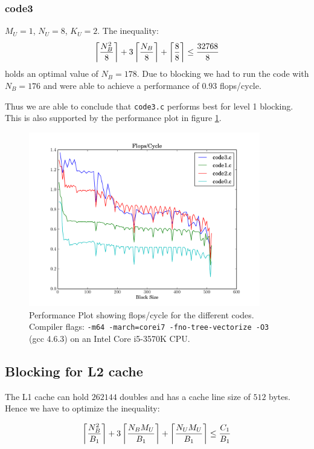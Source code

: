 \documentclass[portrait,a4paper]{article}
\begin{document}
\subsubsection{code3}
$M_U=1$, $N_U=8$, $K_U=2$. The inequality:
\begin{align*}
    \left\lceil {N_B^2 \over 8} \right\rceil + 3\left\lceil {N_B \over 8} \right\rceil
    + \left\lceil {8 \over 8} \right\rceil \leq {32768 \over 8}
\end{align*}
holds an optimal value of $N_B=178$. Due to blocking we had to run the code with $N_B=176$ and were able to achieve a performance of $0.93$ flops/cycle.

Thus we are able to conclude that \lstinline{code3.c} performs best for level 1 blocking. This is also supported by the performance plot in figure \ref{fig:flops_cycle}.

\begin{figure}[H]
    \centering
    \includegraphics[width=0.9\textwidth]{code/flops_cycle}
    \caption{Performance Plot showing flops/cycle for the different codes. Compiler flags: \texttt{-m64 -march=corei7 -fno-tree-vectorize -O3} (gcc 4.6.3) on an Intel Core i5-3570K CPU.}
    \label{fig:flops_cycle}
\end{figure}  

\subsection{Blocking for L2 cache}
The L1 cache can hold $262144$ doubles and has a cache line size of $512$ bytes. Hence we have to optimize the inequality:

\begin{align*}
    \left\lceil {N_B^2 \over B_1} \right\rceil + 3\left\lceil {N_B M_U \over B_1} \right\rceil
    + \left\lceil {N_U M_U \over B_1} \right\rceil \leq {C_1 \over B_1}
\end{align*}
\end{document}
